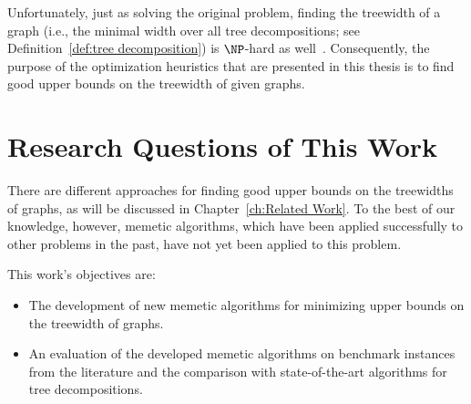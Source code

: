 \documentclass[thesis.tex]{subfiles}
\begin{document}
Unfortunately, just as solving the original problem, finding the treewidth of a graph (i.e., the minimal width over all tree decompositions; see Definition~\ref{def:tree decomposition}) is $\NP$-hard as well~\parencite{arnborg-1987-complexity}. Consequently, the purpose of the optimization heuristics that are presented in this thesis is to find good upper bounds on the treewidth of given graphs.


\section{Research Questions of This Work}
   \label{sec:Research Question}
%
There are different approaches for finding good upper bounds on the treewidths of graphs, as will be discussed in Chapter~\ref{ch:Related Work}. To the best of our knowledge, however, memetic algorithms, which have been applied successfully to other problems in the past, have not yet been applied to this problem. 

\medbreak\noindent%
This work's objectives are:
\begin{itemize}
\item The development of new memetic algorithms for minimizing upper bounds on the treewidth of graphs.
\item An evaluation of the developed memetic algorithms on benchmark instances from the literature and the comparison with state-of-the-art algorithms for tree decompositions.
\end{itemize}


\end{document}
